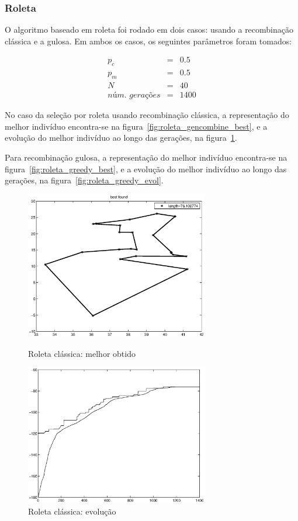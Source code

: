 \documentclass[a4paper]{article}
\begin{document}
\subsubsection{Roleta}
O algoritmo baseado em roleta foi rodado em dois casos: usando a recombinação clássica e a gulosa. Em ambos os casos, os seguintes parâmetros foram tomados:

\begin{eqnarray*}
p_c &=& 0.5\\
p_m &=& 0.5\\
N &=& 40\\
\textit{núm. gerações} &=& 1400
\end{eqnarray*}

No caso da seleção por roleta usando recombinação clássica, a representação do melhor indivíduo encontra-se na figura~\ref{fig:roleta_gencombine_best}, e a evolução do melhor indivíduo ao longo das gerações, na figura~\ref{fig:roleta_gencombine_evol}.

Para recombinação gulosa, a representação do melhor indivíduo encontra-se na figura~\ref{fig:roleta_greedy_best}, e a evolução do melhor indivíduo ao longo das gerações, na figura~\ref{fig:roleta_greedy_evol}.

\begin{figure}
\begin{minipage}[b]{0.5\linewidth} %
\centering
\includegraphics[width=8cm]{roleta_gencombine_best}
\caption{Roleta clássica: melhor obtido}
\label{fig:roleta_gencombine_best}
\end{minipage}
\hspace{0.5cm} %
\begin{minipage}[b]{0.5\linewidth}
\centering
\includegraphics[width=8cm]{roleta_gencombine_evol}
\caption{Roleta clássica: evolução}
\label{fig:roleta_gencombine_evol}
\end{minipage}
\end{figure}
\end{document}
